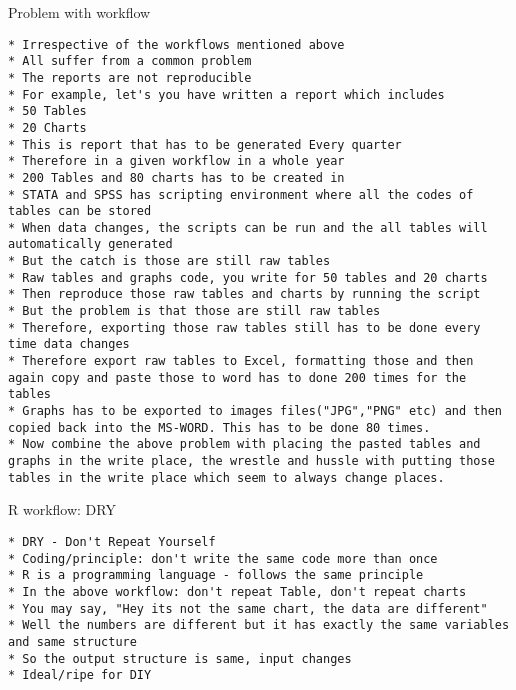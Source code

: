 \begin{frame}[fragile]{Problem with workflow}

\begin{verbatim}
* Irrespective of the workflows mentioned above
* All suffer from a common problem
* The reports are not reproducible
* For example, let's you have written a report which includes 
* 50 Tables
* 20 Charts
* This is report that has to be generated Every quarter
* Therefore in a given workflow in a whole year
* 200 Tables and 80 charts has to be created in 
* STATA and SPSS has scripting environment where all the codes of tables can be stored
* When data changes, the scripts can be run and the all tables will automatically generated
* But the catch is those are still raw tables
* Raw tables and graphs code, you write for 50 tables and 20 charts
* Then reproduce those raw tables and charts by running the script
* But the problem is that those are still raw tables
* Therefore, exporting those raw tables still has to be done every time data changes
* Therefore export raw tables to Excel, formatting those and then again copy and paste those to word has to done 200 times for the tables 
* Graphs has to be exported to images files("JPG","PNG" etc) and then copied back into the MS-WORD. This has to be done 80 times.
* Now combine the above problem with placing the pasted tables and graphs in the write place, the wrestle and hussle with putting those tables in the write place which seem to always change places. 
\end{verbatim}

\end{frame}

\begin{frame}[fragile]{R workflow: DRY}

\begin{verbatim}
* DRY - Don't Repeat Yourself
* Coding/principle: don't write the same code more than once
* R is a programming language - follows the same principle
* In the above workflow: don't repeat Table, don't repeat charts
* You may say, "Hey its not the same chart, the data are different"
* Well the numbers are different but it has exactly the same variables and same structure
* So the output structure is same, input changes
* Ideal/ripe for DIY
\end{verbatim}

\end{frame}

